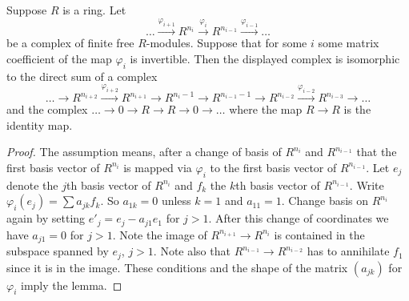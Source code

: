 \begin{lemma}
\label{lemma-add-trivial-complex}
Suppose $R$ is a ring. Let
$$
\ldots
\xrightarrow{\varphi_{i + 1}}
R^{n_i}
\xrightarrow{\varphi_i}
R^{n_{i-1}}
\xrightarrow{\varphi_{i-1}}
\ldots
$$
be a complex of finite free $R$-modules. Suppose that for some $i$
some matrix coefficient of the map $\varphi_i$ is invertible.
Then the displayed complex is isomorphic to the direct sum of a complex
$$
\ldots \to
R^{n_{i + 2}} \xrightarrow{\varphi_{i + 2}}
R^{n_{i + 1}} \to
R^{n_i - 1} \to
R^{n_{i - 1} - 1} \to
R^{n_{i - 2}} \xrightarrow{\varphi_{i - 2}}
R^{n_{i - 3}} \to
\ldots
$$
and the complex $\ldots \to 0 \to R \to R \to 0 \to \ldots$
where the map $R \to R$ is the identity map.
\end{lemma}

\begin{proof}
The assumption means, after a change of basis of
$R^{n_i}$ and $R^{n_{i-1}}$ that the first basis
vector of $R^{n_i}$ is mapped via $\varphi_i$ to the first basis
vector of $R^{n_{i-1}}$. Let $e_j$ denote the
$j$th basis vector of $R^{n_i}$ and $f_k$ the $k$th
basis vector of $R^{n_{i-1}}$. Write $\varphi_i(e_j)
= \sum a_{jk} f_k$. So $a_{1k} = 0$ unless $k = 1$
and $a_{11} = 1$. Change basis on $R^{n_i}$ again
by setting $e'_j = e_j - a_{j1} e_1$ for $j > 1$.
After this change of coordinates we have $a_{j1} = 0$
for $j > 1$. Note the image
of $R^{n_{i + 1}} \to R^{n_i}$ is contained in the
subspace spanned by $e_j$, $j > 1$. Note also
that $R^{n_{i-1}} \to R^{n_{i-2}}$ has to annihilate
$f_1$ since it is in the image. These conditions
and the shape of the matrix $(a_{jk})$ for $\varphi_i$
imply the lemma.
\end{proof}
